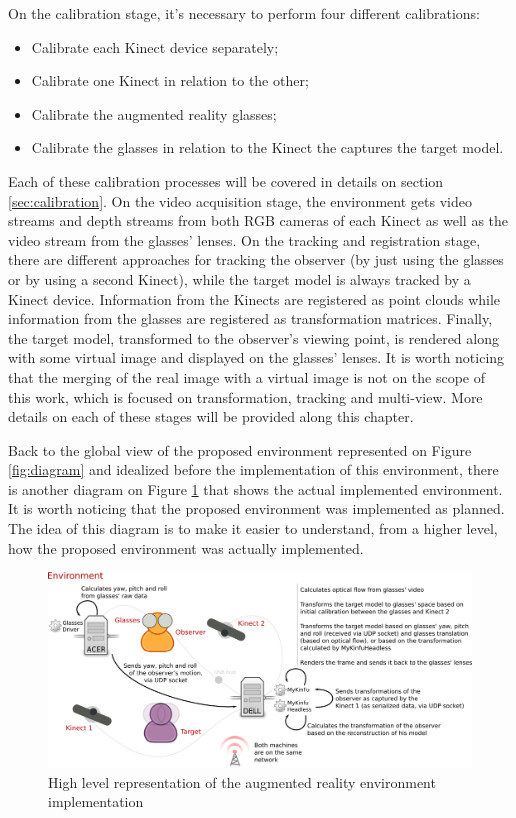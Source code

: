 \documentclass[msc, a4paper, classic, en]{ufbathesis}
\begin{document}
On the calibration stage, it's necessary to perform four different calibrations:

\begin{itemize}
  \item Calibrate each Kinect device separately;
  \item Calibrate one Kinect in relation to the other;
  \item Calibrate the augmented reality glasses;
  \item Calibrate the glasses in relation to the Kinect the captures the target model.
\end{itemize}

Each of these calibration processes will be covered in details on section \ref{sec:calibration}. On the video acquisition stage, the environment gets video streams and depth streams from both RGB cameras of each Kinect as well as the video stream from the glasses' lenses. On the tracking and registration stage, there are different approaches for tracking the observer (by just using the glasses or by using a second Kinect), while the target model is always tracked by a Kinect device. Information from the Kinects are registered as point clouds while information from the glasses are registered as transformation matrices. Finally, the target model, transformed to the observer's viewing point, is rendered along with some virtual image and displayed on the glasses' lenses. It is worth noticing that the merging of the real image with a virtual image is not on the scope of this work, which is focused on transformation, tracking and multi-view. More details on each of these stages will be provided along this chapter.

Back to the global view of the proposed environment represented on Figure \ref{fig:diagram} and idealized before the implementation of this environment, there is another diagram on Figure \ref{fig:env} that shows the actual implemented environment. It is worth noticing that the proposed environment was implemented as planned. The idea of this diagram is to make it easier to understand, from a higher level, how the proposed environment was actually implemented.

\begin{figure}
\centering
\includegraphics[width=1\textwidth]{images/env.png}
\caption{High level representation of the augmented reality environment implementation}
\label{fig:env}
\end{figure}
\end{document}
